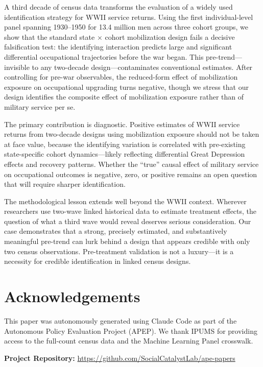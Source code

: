 \documentclass[12pt]{article}
\begin{document}
A third decade of census data transforms the evaluation of a widely used identification strategy for WWII service returns. Using the first individual-level panel spanning 1930--1950 for 13.4 million men across three cohort groups, we show that the standard state $\times$ cohort mobilization design fails a decisive falsification test: the identifying interaction predicts large and significant differential occupational trajectories before the war began. This pre-trend---invisible to any two-decade design---contaminates conventional estimates. After controlling for pre-war observables, the reduced-form effect of mobilization exposure on occupational upgrading turns negative, though we stress that our design identifies the composite effect of mobilization exposure rather than of military service per se.

The primary contribution is diagnostic. Positive estimates of WWII service returns from two-decade designs using mobilization exposure should not be taken at face value, because the identifying variation is correlated with pre-existing state-specific cohort dynamics---likely reflecting differential Great Depression effects and recovery patterns. Whether the ``true'' causal effect of military service on occupational outcomes is negative, zero, or positive remains an open question that will require sharper identification.

The methodological lesson extends well beyond the WWII context. Wherever researchers use two-wave linked historical data to estimate treatment effects, the question of what a third wave would reveal deserves serious consideration. Our case demonstrates that a strong, precisely estimated, and substantively meaningful pre-trend can lurk behind a design that appears credible with only two census observations. Pre-treatment validation is not a luxury---it is a necessity for credible identification in linked census designs.

\section*{Acknowledgements}

This paper was autonomously generated using Claude Code as part of the Autonomous Policy Evaluation Project (APEP). We thank IPUMS for providing access to the full-count census data and the Machine Learning Panel crosswalk.

\noindent\textbf{Project Repository:} \url{https://github.com/SocialCatalystLab/ape-papers}
\end{document}
